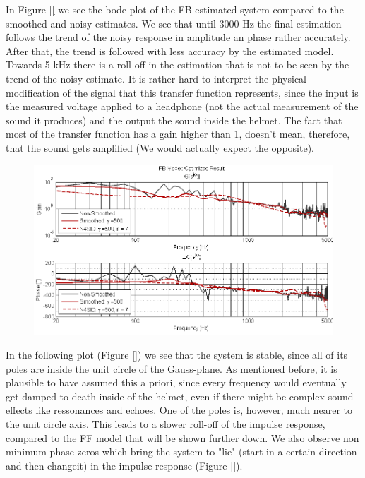 In Figure \ref{} we see the bode plot of the FB estimated system compared to the smoothed and noisy estimates. We see that until 3000 Hz the final estimation follows the trend of the noisy response in amplitude an phase rather accurately. After that, the trend is followed with less accuracy by the estimated model. Towards 5 kHz there is a roll-off in the estimation that is not to be seen by the trend of the noisy estimate. It is rather hard to interpret the physical modification of the signal that this transfer function represents, since the input is the measured voltage applied to a headphone (not the actual measurement of the sound it produces) and the output the sound inside the helmet. The fact that most of the transfer function has a gain higher than 1, doesn't mean, therefore, that the sound gets amplified (We would actually expect the opposite).  \\


\begin{figure}[H]
\centering
\includegraphics[width=1.0\textwidth]{pics/results_FB}
\caption{}
\label{pic:}
\end{figure}

In the following plot (Figure \ref{}) we see that the system is stable, since all of its poles are inside the unit circle of the Gauss-plane. As mentioned before, it is plausible to have assumed this a priori, since every frequency would eventually get damped to death inside of the helmet, even if there might be complex sound effects like ressonances and echoes. One of the poles is, however, much nearer to the unit circle axis. This leads to a slower roll-off of the impulse response, compared to the FF model that will be shown further down. We also observe non minimum phase zeros which bring the system to "lie" (start in a certain direction and then changeit) in the impulse response (Figure \ref{}).

